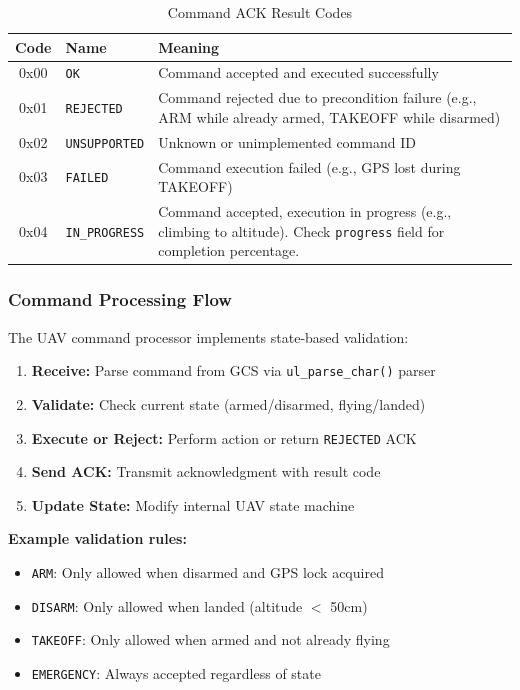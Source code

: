 \documentclass[11pt,a4paper]{article}
\begin{document}
\begin{table}[H]
\centering
\caption{Command ACK Result Codes}
\begin{tabular}{@{}clp{8cm}@{}}
\toprule
\textbf{Code} & \textbf{Name} & \textbf{Meaning} \\
\midrule
0x00 & \texttt{OK}          & Command accepted and executed successfully \\
0x01 & \texttt{REJECTED}    & Command rejected due to precondition failure (e.g., ARM while already armed, TAKEOFF while disarmed) \\
0x02 & \texttt{UNSUPPORTED} & Unknown or unimplemented command ID \\
0x03 & \texttt{FAILED}      & Command execution failed (e.g., GPS lost during TAKEOFF) \\
0x04 & \texttt{IN\_PROGRESS} & Command accepted, execution in progress (e.g., climbing to altitude). Check \texttt{progress} field for completion percentage. \\
\bottomrule
\end{tabular}
\end{table}

\subsubsection{Command Processing Flow}

The UAV command processor implements state-based validation:

\begin{enumerate}[noitemsep]
    \item \textbf{Receive:} Parse command from GCS via \texttt{ul\_parse\_char()} parser
    \item \textbf{Validate:} Check current state (armed/disarmed, flying/landed)
    \item \textbf{Execute or Reject:} Perform action or return \texttt{REJECTED} ACK
    \item \textbf{Send ACK:} Transmit acknowledgment with result code
    \item \textbf{Update State:} Modify internal UAV state machine
\end{enumerate}

\textbf{Example validation rules:}
\begin{itemize}[noitemsep]
    \item \texttt{ARM}: Only allowed when disarmed and GPS lock acquired
    \item \texttt{DISARM}: Only allowed when landed (altitude $<$ 50cm)
    \item \texttt{TAKEOFF}: Only allowed when armed and not already flying
    \item \texttt{EMERGENCY}: Always accepted regardless of state
\end{itemize}
\end{document}
